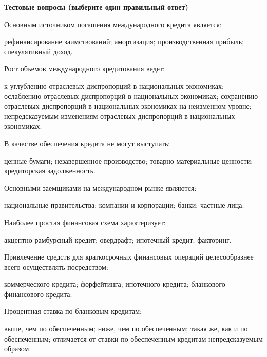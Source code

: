 \documentclass[12pt, table]{exam}
\begin{document}
\pagebreak
\noindent\textbf{Тестовые вопросы (выберите один правильный ответ)}

\begin{questions}
\begin{multicols}{2}
\setlength{\columnsep}{1cm}

\question Основным источником погашения международного кредита является:
	 \begin{choices}
	 \CC рефинансирование заимствований;
	 \choice амортизация;
	 \choice производственная прибыль;
	 \choice спекулятивный доход.
	 \end{choices}
\question Рост объемов международного кредитования ведет:
	 \begin{choices}
	 \CC к углублению отраслевых диспропорций в национальных экономиках;
	 \choice ослаблению отраслевых диспропорций в национальных экономиках;
	 \choice сохранению отраслевых диспропорций в национальных экономиках на неизменном уровне;
	 \choice непредсказуемым изменениям отраслевых диспропорций в национальных экономиках.
	 \end{choices}
\question В качестве обеспечения кредита не могут выступать:
	 \begin{choices}
	 \choice ценные бумаги;
	 \choice незавершенное производство;
	 \choice товарно-материальные ценности;
	 \CC кредиторская задолженность.
	 \end{choices}
\question Основными заемщиками на международном рынке являются:
	 \begin{choices}
	 \choice национальные правительства;
	 \CC компании и корпорации;
	 \choice банки;
	 \choice частные лица.
	 \end{choices}
\question Наиболее простая финансовая схема характеризует:
	 \begin{choices}
	 \CC акцептно-рамбурсный кредит;
	 \choice овердрафт;
	 \choice ипотечный кредит;
	 \choice факторинг.
	 \end{choices}
\question Привлечение средств для краткосрочных финансовых операций целесообразнее всего осуществлять посредством:
	 \begin{choices}
	 \choice коммерческого кредита;
	 \choice форфейтинга;
	 \choice ипотечного кредита;
	 \CC бланкового финансового кредита.
	 \end{choices}
\question Процентная ставка по бланковым кредитам:
	 \begin{choices}
	 \CC выше, чем по обеспеченным;
	 \choice ниже, чем по обеспеченным;
	 \choice такая же, как и по обеспеченным;
	 \choice отличается от ставки по обеспеченным кредитам непредсказуемым образом.

\end{choices}
\end{multicols}
\end{questions}
\end{document}
